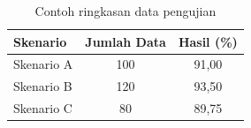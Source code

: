 \begin{table}[H]
  \centering
  \caption{Contoh ringkasan data pengujian}
  \label{tab:contoh-data}
  \begin{tabular}{lcc}
    \toprule
    \textbf{Skenario} & \textbf{Jumlah Data} & \textbf{Hasil (\%)} \\
    \midrule
    Skenario A & 100 & 91,00 \\
    Skenario B & 120 & 93,50 \\
    Skenario C & 80  & 89,75 \\
    \bottomrule
  \end{tabular}
\end{table}
